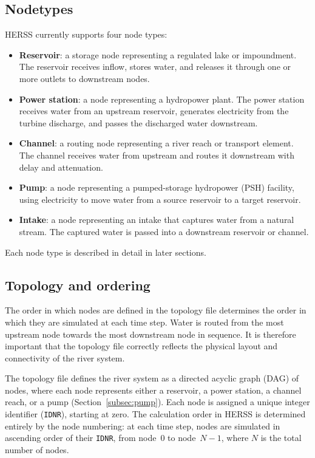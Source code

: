 \documentclass[a4paper, 12pt]{report}
\begin{document}
	\subsection{Nodetypes}

	HERSS currently supports four node types:

	\begin{itemize}
		\item \textbf{Reservoir}: a storage node representing a regulated lake or impoundment. The reservoir receives inflow, stores water, and releases it through one or more outlets to downstream nodes.
		
		\item \textbf{Power station}: a node representing a hydropower plant. The power station receives water from an upstream reservoir, generates electricity from the turbine discharge, and passes the discharged water downstream.
		
		\item \textbf{Channel}: a routing node representing a river reach or transport element. The channel receives water from upstream and routes it downstream with delay and attenuation.
		
		\item \textbf{Pump}: a node representing a pumped-storage hydropower (PSH) facility, using electricity to move water from a source reservoir to a target reservoir.
		

		\item \textbf{Intake}: a node representing an intake that captures water from a natural stream. The captured water is passed into a downstream reservoir or channel.
		
		
	\end{itemize}

	Each node type is described in detail in later sections. 
	
	
	\subsection{Topology and ordering}

	The order in which nodes are defined in the topology file determines the order in which they are simulated at each time step. Water is routed from the most upstream node towards the most downstream node in sequence. It is therefore important that the topology file correctly reflects the physical layout and connectivity of the river system. 
	
	The topology file defines the river system as a directed acyclic graph (DAG) of nodes, where each node represents either a reservoir, a power station, a channel reach, or a pump (Section~\ref{subsec:pump}). Each node is assigned a unique integer identifier (\texttt{IDNR}), starting at zero. The calculation order in HERSS is determined entirely by the node numbering: at each time step, nodes are simulated in ascending order of their \texttt{IDNR}, from node~$0$ to node~$N-1$, where $N$ is the total number of nodes.
	
\end{document}
